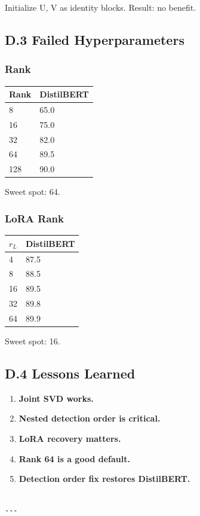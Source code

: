 Initialize U, V as identity blocks. Result: no benefit.

\subsection{D.3 Failed Hyperparameters}

\subsubsection{Rank}

\begin{table}[H]
\centering
\small
\begin{tabular}{ll}
\toprule
\textbf{Rank} & \textbf{DistilBERT} \\
\midrule
8 & 65.0 \\
16 & 75.0 \\
32 & 82.0 \\
64 & 89.5 \\
128 & 90.0 \\
\bottomrule
\end{tabular}
\end{table}

Sweet spot: 64.

\subsubsection{LoRA Rank}

\begin{table}[H]
\centering
\small
\begin{tabular}{ll}
\toprule
\textbf{$r_L$} & \textbf{DistilBERT} \\
\midrule
4 & 87.5 \\
8 & 88.5 \\
16 & 89.5 \\
32 & 89.8 \\
64 & 89.9 \\
\bottomrule
\end{tabular}
\end{table}

Sweet spot: 16.

\subsection{D.4 Lessons Learned}

\begin{enumerate}
\item \textbf{Joint SVD works.}
\item \textbf{Nested detection order is critical.}
\item \textbf{LoRA recovery matters.}
\item \textbf{Rank 64 is a good default.}
\item \textbf{Detection order fix restores DistilBERT.}
\end{enumerate}
\begin{lstlisting}

---
\end{lstlisting}


